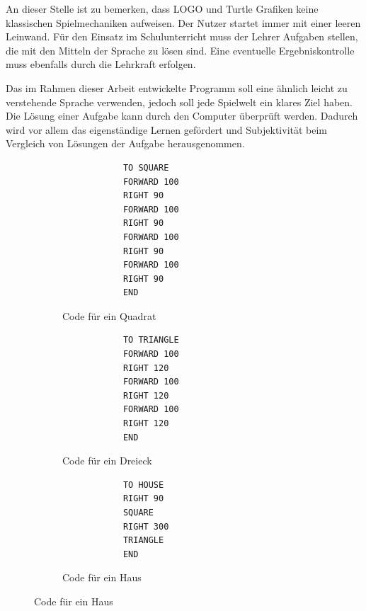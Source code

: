 An dieser Stelle ist zu bemerken, dass LOGO und Turtle Grafiken keine klassischen Spielmechaniken aufweisen. Der Nutzer startet immer mit einer leeren Leinwand. Für den Einsatz im Schulunterricht muss der Lehrer Aufgaben stellen, die mit den Mitteln der Sprache zu lösen sind. Eine eventuelle Ergebniskontrolle muss ebenfalls durch die Lehrkraft erfolgen.

Das im Rahmen dieser Arbeit entwickelte Programm soll eine ähnlich leicht zu verstehende Sprache verwenden, jedoch soll jede Spielwelt ein klares Ziel haben. Die Lösung einer Aufgabe kann durch den Computer überprüft werden. Dadurch wird vor allem das eigenständige Lernen gefördert und Subjektivität beim Vergleich von Lösungen der Aufgabe herausgenommen.

\begin{figure}
    \begin{subfigure}[b]{0.3\textwidth}
        \begin{lstlisting}
            TO SQUARE
            FORWARD 100
            RIGHT 90
            FORWARD 100
            RIGHT 90
            FORWARD 100
            RIGHT 90
            FORWARD 100
            RIGHT 90
            END
            \end{lstlisting}
        \caption{Code für ein Quadrat}
        \label{fig:related:turtle:square:code}
        \vspace{0.5cm}
    \end{subfigure}\hfill
    \begin{subfigure}[b]{0.3\textwidth}
        \begin{lstlisting}
            TO TRIANGLE
            FORWARD 100
            RIGHT 120
            FORWARD 100
            RIGHT 120
            FORWARD 100
            RIGHT 120
            END
            \end{lstlisting}
        \caption{Code für ein Dreieck}
        \label{fig:related:turtle:triangle:code}
        \vspace{0.5cm}
    \end{subfigure}\hfill
    \begin{subfigure}[b]{0.3\textwidth}
        \begin{lstlisting}
            TO HOUSE
            RIGHT 90
            SQUARE
            RIGHT 300
            TRIANGLE
            END
            \end{lstlisting}
        \caption{Code für ein Haus}
        \label{fig:related:turtle:house:code}
        \vspace{0.5cm}
    \end{subfigure}

\end{figure}
